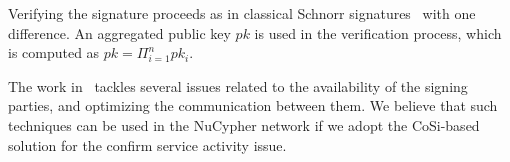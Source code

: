 Verifying the signature proceeds as in classical Schnorr signatures~\cite{schnorr1991efficient} with one difference. An aggregated public key $pk$ is used in the verification process, which is computed as $pk = \Pi_{i=1}^{n} pk_i$.


The work in~\cite{syta2016keeping} tackles several issues related to the availability of the signing parties, and optimizing the communication between them. We believe that such techniques can be used in the NuCypher network if we adopt the CoSi-based solution for the confirm service activity issue.